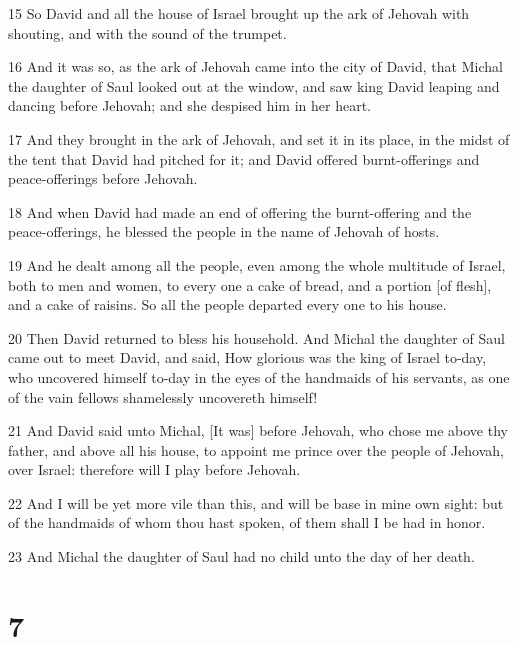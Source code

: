 \par 15 So David and all the house of Israel brought up the ark of Jehovah with shouting, and with the sound of the trumpet.
\par 16 And it was so, as the ark of Jehovah came into the city of David, that Michal the daughter of Saul looked out at the window, and saw king David leaping and dancing before Jehovah; and she despised him in her heart.
\par 17 And they brought in the ark of Jehovah, and set it in its place, in the midst of the tent that David had pitched for it; and David offered burnt-offerings and peace-offerings before Jehovah.
\par 18 And when David had made an end of offering the burnt-offering and the peace-offerings, he blessed the people in the name of Jehovah of hosts.
\par 19 And he dealt among all the people, even among the whole multitude of Israel, both to men and women, to every one a cake of bread, and a portion [of flesh], and a cake of raisins. So all the people departed every one to his house.
\par 20 Then David returned to bless his household. And Michal the daughter of Saul came out to meet David, and said, How glorious was the king of Israel to-day, who uncovered himself to-day in the eyes of the handmaids of his servants, as one of the vain fellows shamelessly uncovereth himself!
\par 21 And David said unto Michal, [It was] before Jehovah, who chose me above thy father, and above all his house, to appoint me prince over the people of Jehovah, over Israel: therefore will I play before Jehovah.
\par 22 And I will be yet more vile than this, and will be base in mine own sight: but of the handmaids of whom thou hast spoken, of them shall I be had in honor.
\par 23 And Michal the daughter of Saul had no child unto the day of her death.

\chapter{7}

